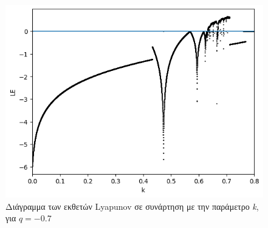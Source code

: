 \begin{figure}[ht]
	\centering
	\includegraphics[width=1\linewidth]{LateX images/graphs q09/g2}
	\caption{Διάγραμμα των εκθετών Lyapunov σε συνάρτηση με την παράμετρο \emph{k}, για $q=-0.7$}
	\label{f:g15}
\end{figure}


